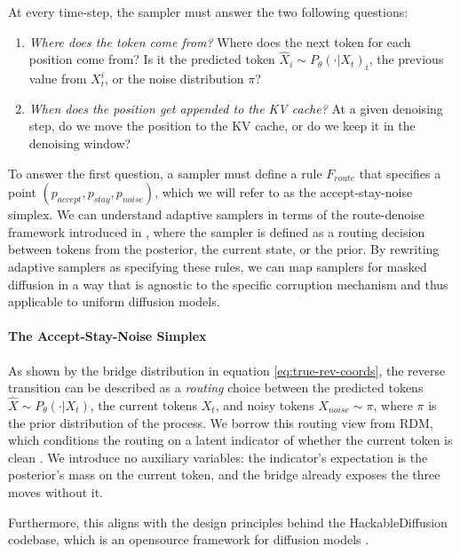 At every time-step, the sampler must answer the two following questions: 
\begin{enumerate}
    \item \textit{Where does the token come from?} Where does the next token for each position come from? Is it the predicted token $\hat{X}_i \sim P_{\theta}(\cdot | X_t)_i$, the previous value from $X_t^i$, or the noise distribution $\pi$? 
    \item \textit{When does the position get appended to the KV cache?} At a given denoising step, do we move the position to the KV cache, or do we keep it in the denoising window?
\end{enumerate}


To answer the first question, a sampler must define a rule $F_{route}$ that specifies a point $(p_{accept},\allowbreak p_{stay},\allowbreak p_{noise})$, which we will refer to as the accept-stay-noise simplex. 
We can understand adaptive samplers in terms of the route-denoise framework introduced in \citet{zheng2023reparameterized}, where the sampler is defined as a routing decision between tokens from the posterior, the current state, or the prior.
By rewriting adaptive samplers as specifying these rules, we can map samplers for masked diffusion in a way that is agnostic to the specific corruption mechanism and thus applicable to uniform diffusion models.

\paragraph{The Accept-Stay-Noise Simplex}
As shown by the bridge distribution in equation \ref{eq:true-rev-coords}, the reverse transition can be described as a \textit{routing} choice between the predicted tokens $\hat{X} \sim P_{\theta}(\cdot | X_t)$, the current tokens $X_t$, and noisy tokens $X_{noise} \sim \pi$, where $\pi$ is the prior distribution of the process. 
We borrow this routing view from RDM, which conditions the routing on a latent indicator of whether the current token is clean \citep{zheng2023reparameterized}. 
We introduce no auxiliary variables: the indicator's expectation is the posterior's mass on the current token, and the bridge already exposes the three moves without it.

Furthermore, this aligns with the design principles behind the HackableDiffusion codebase, which is an opensource framework for diffusion models \citep{hackable_diffusion2026github}.

